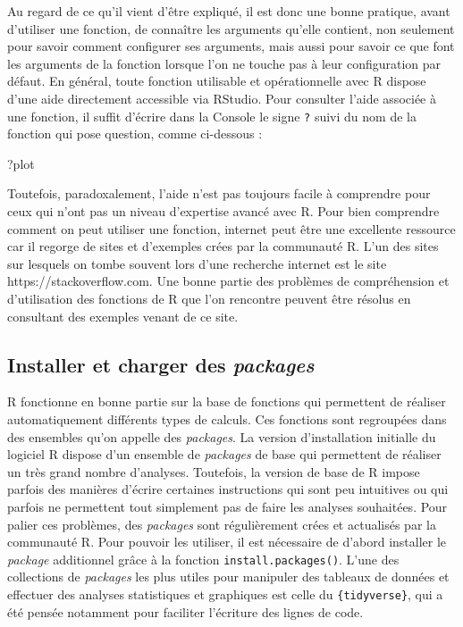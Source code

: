 \documentclass[
  letterpaper,
]{book}
\newenvironment{Shaded}{\begin{snugshade}}{\end{snugshade}}
\newcommand{\NormalTok}[1]{\textcolor[rgb]{0.00,0.23,0.31}{#1}}
\begin{document}
Au regard de ce qu'il vient d'être expliqué, il est donc une bonne
pratique, avant d'utiliser une fonction, de connaître les arguments
qu'elle contient, non seulement pour savoir comment configurer ses
arguments, mais aussi pour savoir ce que font les arguments de la
fonction lorsque l'on ne touche pas à leur configuration par défaut. En
général, toute fonction utilisable et opérationnelle avec R dispose
d'une aide directement accessible via RStudio. Pour consulter l'aide
associée à une fonction, il suffit d'écrire dans la Console le signe
\texttt{?} suivi du nom de la fonction qui pose question, comme
ci-dessous :

\begin{Shaded}
\begin{Highlighting}[]
\NormalTok{?plot}
\end{Highlighting}
\end{Shaded}

Toutefois, paradoxalement, l'aide n'est pas toujours facile à comprendre
pour ceux qui n'ont pas un niveau d'expertise avancé avec R. Pour bien
comprendre comment on peut utiliser une fonction, internet peut être une
excellente ressource car il regorge de sites et d'exemples crées par la
communauté R. L'un des sites sur lesquels on tombe souvent lors d'une
recherche internet est le site https://stackoverflow.com. Une bonne
partie des problèmes de compréhension et d'utilisation des fonctions de
R que l'on rencontre peuvent être résolus en consultant des exemples
venant de ce site.

\subsection{\texorpdfstring{Installer et charger des
\emph{packages}}{Installer et charger des packages}}\label{installer-et-charger-des-packages}

R fonctionne en bonne partie sur la base de fonctions qui permettent de
réaliser automatiquement différents types de calculs. Ces fonctions sont
regroupées dans des ensembles qu'on appelle des \emph{packages}. La
version d'installation initialle du logiciel R dispose d'un ensemble de
\emph{packages} de base qui permettent de réaliser un très grand nombre
d'analyses. Toutefois, la version de base de R impose parfois des
manières d'écrire certaines instructions qui sont peu intuitives ou qui
parfois ne permettent tout simplement pas de faire les analyses
souhaitées. Pour palier ces problèmes, des \emph{packages} sont
régulièrement crées et actualisés par la communauté R. Pour pouvoir les
utiliser, il est nécessaire de d'abord installer le \emph{package}
additionnel grâce à la fonction \texttt{install.packages()}. L'une des
collections de \emph{packages} les plus utiles pour manipuler des
tableaux de données et effectuer des analyses statistiques et graphiques
est celle du \texttt{\{tidyverse\}}, qui a été pensée notamment pour
faciliter l'écriture des lignes de code.
\end{document}
